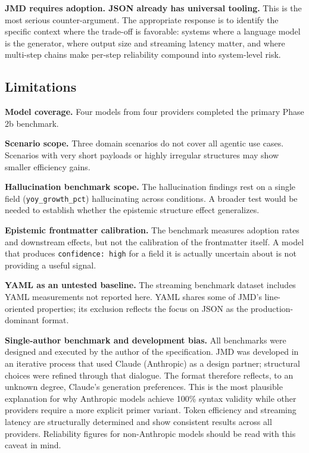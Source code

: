 \documentclass[11pt]{article}
\begin{document}
\textbf{JMD requires adoption. JSON already has universal tooling.}
This is the most serious counter-argument. The appropriate response is to identify the specific context where the trade-off is favorable: systems where a language model is the generator, where output size and streaming latency matter, and where multi-step chains make per-step reliability compound into system-level risk.

\subsection{Limitations}

\textbf{Model coverage.} Four models from four providers completed the primary Phase 2b benchmark.

\textbf{Scenario scope.} Three domain scenarios do not cover all agentic use cases. Scenarios with very short payloads or highly irregular structures may show smaller efficiency gains.

\textbf{Hallucination benchmark scope.} The hallucination findings rest on a single field (\texttt{yoy\_growth\_pct}) hallucinating across conditions. A broader test would be needed to establish whether the epistemic structure effect generalizes.

\textbf{Epistemic frontmatter calibration.} The benchmark measures adoption rates and downstream effects, but not the calibration of the frontmatter itself. A model that produces \texttt{confidence: high} for a field it is actually uncertain about is not providing a useful signal.

\textbf{YAML as an untested baseline.} The streaming benchmark dataset includes YAML measurements not reported here. YAML shares some of JMD's line-oriented properties; its exclusion reflects the focus on JSON as the production-dominant format.

\textbf{Single-author benchmark and development bias.} All benchmarks were designed and executed by the author of the specification. JMD was developed in an iterative process that used Claude (Anthropic) as a design partner; structural choices were refined through that dialogue. The format therefore reflects, to an unknown degree, Claude's generation preferences. This is the most plausible explanation for why Anthropic models achieve 100\% syntax validity while other providers require a more explicit primer variant. Token efficiency and streaming latency are structurally determined and show consistent results across all providers. Reliability figures for non-Anthropic models should be read with this caveat in mind.
\end{document}
